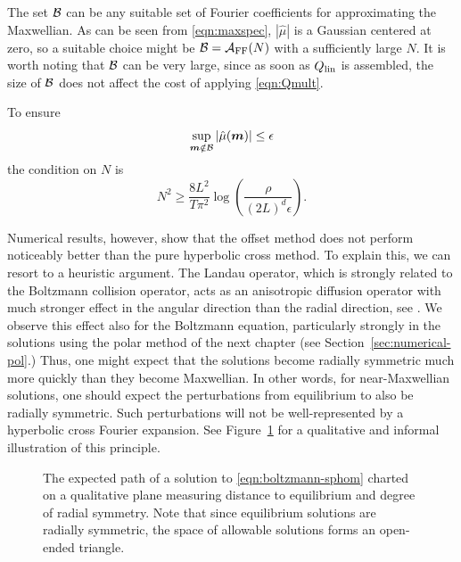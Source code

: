 The set $\mathcal{B}$ can be any suitable set of Fourier coefficients for approximating
the Maxwellian. As can be seen from \eqref{eqn:maxspec}, $|\hat{\mu}|$
is a Gaussian centered at zero, so a suitable choice might be $\mathcal{B}=\mathcal{A}_\text{FF}(N)$ with
a sufficiently large $N$. It is worth noting that $\mathcal{B}$ can be very large, since
as soon as $Q_\text{lin}$ is assembled, the size of $\mathcal{B}$ does not affect the cost of
applying \eqref{eqn:Qmult}.

To ensure
\[
    \sup_{{\bm m}\notin\mathcal{B}} |\hat{\mu}({\bm m})| \leq \epsilon
\]
the condition on $N$ is
\[
    N^2 \geq \frac{8L^2}{T\pi^2}\log\left(\frac{\rho}{(2L)^d\epsilon}\right).
\]

Numerical results, however, show that the offset method does not perform noticeably better than the pure
hyperbolic cross method. To explain this, we can resort to a heuristic argument. The Landau operator, which is
strongly related to the Boltzmann collision operator, acts as an anisotropic diffusion operator with much
stronger effect in the angular direction than the radial direction, see \cite{Guo2002lep}. We observe this effect
also for the Boltzmann equation, particularly strongly in the solutions using the polar method of the next
chapter (see Section~\ref{sec:numerical-pol}.) Thus, one might expect that the solutions become radially
symmetric much more quickly than they become Maxwellian. In other words, for near-Maxwellian solutions, one
should expect the perturbations from equilibrium to also be radially symmetric.  Such perturbations will not
be well-represented by a hyperbolic cross Fourier expansion. See Figure~\ref{fig:offset-heuristic} for a
qualitative and informal illustration of this principle.

\begin{figure}
\centering
{}
\caption{The expected path of a solution to \eqref{eqn:boltzmann-sphom} charted on a qualitative plane
measuring distance to equilibrium and degree of radial symmetry. Note that since equilibrium solutions are
radially symmetric, the space of allowable solutions forms an open-ended triangle.}
\label{fig:offset-heuristic}
\end{figure}

